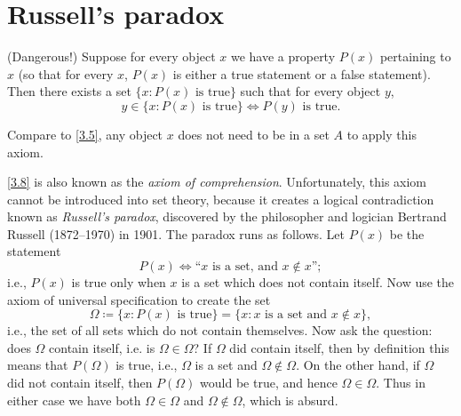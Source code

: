 \section{Russell's paradox}\label{sec:3.2}

\begin{ax}\label{3.8}
  (Dangerous!)
  Suppose for every object \(x\) we have a property \(P(x)\) pertaining to \(x\) (so that for every \(x\), \(P(x)\) is either a true statement or a false statement).
  Then there exists a set \(\{x : P(x) \text{ is true}\}\) such that for every object \(y\),
  \[
    y \in \{x : P(x) \text{ is true}\} \iff P(y) \text{ is true}.
  \]
\end{ax}

\begin{note}
  Compare to \cref{3.5}, any object \(x\) does not need to be in a set \(A\) to apply this axiom.
\end{note}

\begin{note}
  \cref{3.8} is also known as the \emph{axiom of comprehension}.
  Unfortunately, this axiom cannot be introduced into set theory, because it creates a logical contradiction known as \emph{Russell's paradox}, discovered by the philosopher and logician Bertrand Russell (1872--1970) in 1901.
  The paradox runs as follows.
  Let \(P(x)\) be the statement
  \[
    P(x) \iff \text{``\(x\) is a set, and \(x \notin x\)''};
  \]
  i.e., \(P(x)\) is true only when \(x\) is a set which does not contain itself.
  Now use the axiom of universal specification to create the set
  \[
    \Omega \coloneqq \{x : P(x) \text{ is true}\} = \{x : x \text{ is a set and } x \notin x\},
  \]
  i.e., the set of all sets which do not contain themselves.
  Now ask the question: does \(\Omega\) contain itself, i.e. is \(\Omega \in \Omega\)?
  If \(\Omega\) did contain itself, then by definition this means that \(P(\Omega)\) is true, i.e., \(\Omega\) is a set and \(\Omega \notin \Omega\).
  On the other hand, if \(\Omega\) did not contain itself, then \(P(\Omega)\) would be true, and hence \(\Omega \in \Omega\).
  Thus in either case we have both \(\Omega \in \Omega\) and \(\Omega \notin \Omega\), which is absurd.
\end{note}

